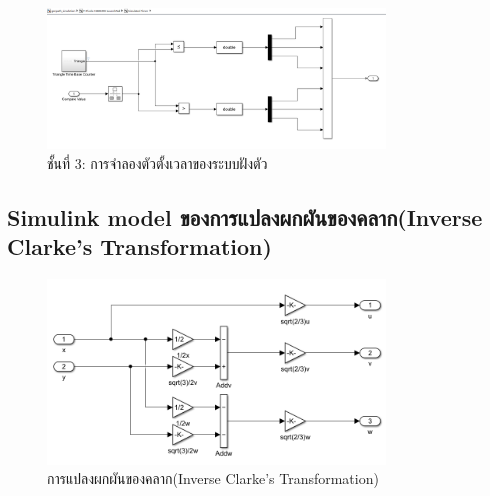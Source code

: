\documentclass[11pt,a4paper]{article}
\begin{document}
\begin{figure}[H]
    \centering
    \includegraphics[width=0.8\textwidth]{l3-sim-tim.png}
    \caption{ชั้นที่ 3: การจำลองตัวตั้งเวลาของระบบฝังตัว}
\end{figure}

\subsection{Simulink model ของการแปลงผกผันของคลาก(Inverse Clarke's Transformation)}
\begin{figure}[H]
    \centering
    \includegraphics[width=0.8\textwidth]{inverse_clarke.png}
    \caption{การแปลงผกผันของคลาก(Inverse Clarke's Transformation)}
\end{figure}


\end{document}
